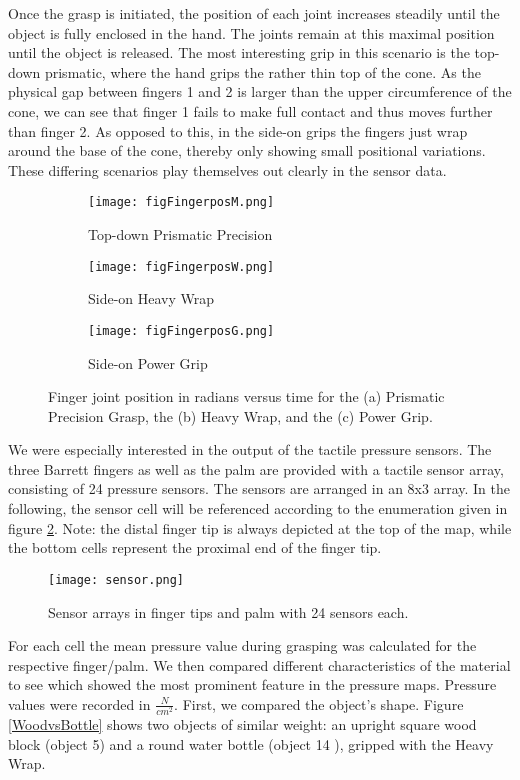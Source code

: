 Once the grasp is initiated, the position of each joint increases steadily until the object is fully enclosed in the hand. The joints remain at this maximal position until the object is released. The most interesting grip in this scenario is the top-down prismatic, where the hand grips the rather thin top of the cone. As the physical gap between fingers 1 and 2 is larger than the upper circumference of the cone, we can see that finger 1 fails to make full contact and thus moves further than finger 2. As opposed to this, in the side-on grips the fingers just wrap around the base of the cone, thereby only showing small positional variations. These differing scenarios play themselves out clearly in the sensor data. 
\begin{figure}[H]
        \centering
        \begin{subfigure}{0.5\textwidth}
                \texttt{[image: figFingerposM.png]}
                \caption{Top-down Prismatic Precision}
        \end{subfigure}
        \begin{subfigure}{0.5\textwidth}
                \texttt{[image: figFingerposW.png]}
                \caption{Side-on Heavy Wrap}
        \end{subfigure}
        \begin{subfigure}{0.5\textwidth}
                \texttt{[image: figFingerposG.png]}
                \caption{Side-on Power Grip}
        \end{subfigure}
        \caption{Finger joint position in radians versus time for the (a) Prismatic Precision Grasp, the (b) Heavy Wrap, and the (c) Power Grip.}
        \label{fingerPos}
\end{figure}

We were especially interested in the output of the tactile pressure sensors. The three Barrett fingers as well as the palm are provided with a tactile sensor array, consisting of 24 pressure sensors. The sensors are arranged in an 8x3 array. In the following, the sensor cell will be referenced according to the enumeration given in figure \ref{senspos}. Note: the distal finger tip is always depicted at the top of the map, while the bottom cells represent the proximal end of the finger tip.
\begin{figure}[H]
        \centering
         \texttt{[image: sensor.png]}
          \caption{Sensor arrays in finger tips and palm with 24 sensors each.}
          \label{senspos}
\end{figure}
\vspace{-0.25cm}
For each cell the mean pressure value during grasping was calculated for the respective finger/palm. We then compared different characteristics of the material to see which showed the most prominent feature in the pressure maps. Pressure values were recorded in $\frac{N}{cm^2}$. First, we compared the object's shape. Figure \ref{WoodvsBottle} shows two objects of similar weight: an upright square wood block (object 5) and a round water bottle (object 14 ), gripped with the Heavy Wrap.

